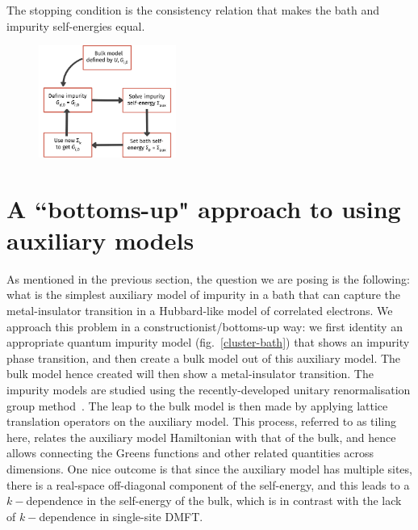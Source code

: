\documentclass[reprint,hidelinks]{revtex4-2}
\begin{document}
The stopping condition is the consistency relation that makes the bath and impurity self-energies equal.

\begin{figure}[!htb]
	\centering
	\includegraphics[width=0.4\textwidth]{dmft_scheme.pdf}
\end{figure}


\section{A ``bottoms-up" approach to using auxiliary models}
As mentioned in the previous section, the question we are posing is the following: what is the simplest auxiliary model of impurity in a bath that can capture the metal-insulator transition in a Hubbard-like model of correlated electrons. We approach this problem in a constructionist/bottoms-up way: we first identity an appropriate quantum impurity model (fig.~\ref{cluster-bath}) that shows an impurity phase transition, and then create a bulk model out of this auxiliary model. The bulk model hence created will then show a metal-insulator transition. The impurity models are studied using the recently-developed unitary renormalisation group method~\cite{anirbanmott1,anirbanmott2,anirbanurg1,anirbanurg2,siddharthacpi,santanukagome}. The leap to the bulk model is then made by applying lattice translation operators on the auxiliary model. This process, referred to as tiling here, relates the auxiliary model Hamiltonian with that of the bulk, and hence allows connecting the Greens functions and other related quantities across dimensions. One nice outcome is that since the auxiliary model has multiple sites, there is a real-space off-diagonal component of the self-energy, and this leads to a \(k-\)dependence in the self-energy of the bulk, which is in contrast with the lack of \(k-\)dependence in single-site DMFT.  
\end{document}
